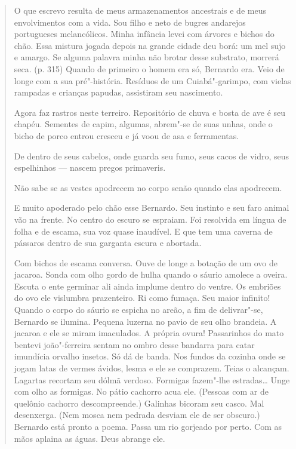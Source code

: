 \begin{quote}
O que escrevo resulta de meus armazenamentos ancestrais e de meus
envolvimentos com a vida. Sou filho e neto de bugres andarejos
portugueses melancólicos. Minha infância levei com árvores e bichos do
chão. Essa mistura jogada depois na grande cidade deu borá: um mel sujo
e amargo. Se alguma palavra minha não brotar desse substrato, morrerá
seca. (p. 315) Quando de primeiro o homem era só, Bernardo era. Veio de
longe com a sua pré"-história. Resíduos de um Cuiabá"-garimpo, com vielas
rampadas e crianças papudas, assistiram seu nascimento.

Agora faz rastros neste terreiro. Repositório de chuva e
bosta de ave é seu chapéu. Sementes de capim, algumas, abrem"-se de suas
unhas, onde o bicho de porco entrou cresceu e já voou de asa e
ferramentas.

De dentro de seus cabelos, onde guarda seu fumo, seus cacos de vidro,
seus espelhinhos --- nascem pregos primaveris.

Não sabe se as vestes apodrecem no corpo senão quando elas apodrecem.

E muito apoderado pelo chão esse Bernardo. Seu instinto e seu faro
animal vão na frente. No centro do escuro se espraiam. Foi resolvida em
língua de folha e de escama, sua voz quase inaudível. E que tem uma
caverna de pássaros dentro de sua garganta escura e abortada.

Com bichos de escama conversa. Ouve de longe a botação de um ovo de
jacaroa. Sonda com olho gordo de hulha quando o sáurio amolece a oveira.
Escuta o ente germinar ali ainda implume dentro do ventre. Os embriões
do ovo ele vislumbra prazenteiro. Ri como fumaça. Seu maior infinito!
Quando o corpo do sáurio se espicha no areão, a fim de delivrar"-se,
Bernardo se ilumina. Pequena luzerna no pavio de seu olho brandeia. A
jacaroa e ele se miram imaculados. A própria ovura! Passarinhos do mato
bentevi joão"-ferreira sentam no ombro desse bandarra para catar
imundícia orvalho insetos. Só dá de banda. Nos fundos da cozinha onde se
jogam latas de vermes ávidos, lesma e ele se comprazem. Teias o
alcançam. Lagartas recortam seu dólmã verdoso. Formigas fazem"-lhe
estradas\ldots{} Unge com olho as formigas. No pátio cachorro acua ele.
(Pessoas com ar de quelônio cachorro descompreende.) Galinhas bicoram
seu casco. Mal desenxerga. (Nem mosca nem pedrada desviam ele de ser
obscuro.) Bernardo está pronto a poema. Passa um rio gorjeado por perto.
Com as mãos aplaina as águas. Deus abrange ele.
\end{quote}

